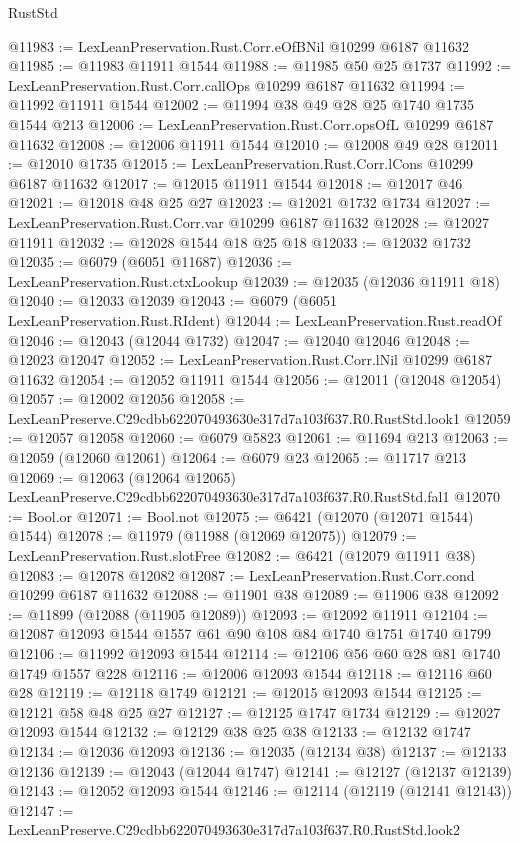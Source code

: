 \begin{lexlean}{RustStd}
\begin{coremodule}
@11983 := LexLeanPreservation.Rust.Corr.eOfBNil @10299 @6187 @11632
@11985 := @11983 @11911 @1544
@11988 := @11985 @50 @25 @1737
@11992 := LexLeanPreservation.Rust.Corr.callOps @10299 @6187 @11632
@11994 := @11992 @11911 @1544
@12002 := @11994 @38 @49 @28 @25 @1740 @1735 @1544 @213
@12006 := LexLeanPreservation.Rust.Corr.opsOfL @10299 @6187 @11632
@12008 := @12006 @11911 @1544
@12010 := @12008 @49 @28
@12011 := @12010 @1735
@12015 := LexLeanPreservation.Rust.Corr.lCons @10299 @6187 @11632
@12017 := @12015 @11911 @1544
@12018 := @12017 @46
@12021 := @12018 @48 @25 @27
@12023 := @12021 @1732 @1734
@12027 := LexLeanPreservation.Rust.Corr.var @10299 @6187 @11632
@12028 := @12027 @11911
@12032 := @12028 @1544 @18 @25 @18
@12033 := @12032 @1732
@12035 := @6079 (@6051 @11687)
@12036 := LexLeanPreservation.Rust.ctxLookup
@12039 := @12035 (@12036 @11911 @18)
@12040 := @12033 @12039
@12043 := @6079 (@6051 LexLeanPreservation.Rust.RIdent)
@12044 := LexLeanPreservation.Rust.readOf
@12046 := @12043 (@12044 @1732)
@12047 := @12040 @12046
@12048 := @12023 @12047
@12052 := LexLeanPreservation.Rust.Corr.lNil @10299 @6187 @11632
@12054 := @12052 @11911 @1544
@12056 := @12011 (@12048 @12054)
@12057 := @12002 @12056
@12058 := LexLeanPreserve.C29cdbb622070493630e317d7a103f637.R0.RustStd.look1
@12059 := @12057 @12058
@12060 := @6079 @5823
@12061 := @11694 @213
@12063 := @12059 (@12060 @12061)
@12064 := @6079 @23
@12065 := @11717 @213
@12069 := @12063 (@12064 @12065) LexLeanPreserve.C29cdbb622070493630e317d7a103f637.R0.RustStd.fal1
@12070 := Bool.or
@12071 := Bool.not
@12075 := @6421 (@12070 (@12071 @1544) @1544)
@12078 := @11979 (@11988 (@12069 @12075))
@12079 := LexLeanPreservation.Rust.slotFree
@12082 := @6421 (@12079 @11911 @38)
@12083 := @12078 @12082
@12087 := LexLeanPreservation.Rust.Corr.cond @10299 @6187 @11632
@12088 := @11901 @38
@12089 := @11906 @38
@12092 := @11899 (@12088 (@11905 @12089))
@12093 := @12092 @11911
@12104 := @12087 @12093 @1544 @1557 @61 @90 @108 @84 @1740 @1751 @1740 @1799
@12106 := @11992 @12093 @1544
@12114 := @12106 @56 @60 @28 @81 @1740 @1749 @1557 @228
@12116 := @12006 @12093 @1544
@12118 := @12116 @60 @28
@12119 := @12118 @1749
@12121 := @12015 @12093 @1544
@12125 := @12121 @58 @48 @25 @27
@12127 := @12125 @1747 @1734
@12129 := @12027 @12093 @1544
@12132 := @12129 @38 @25 @38
@12133 := @12132 @1747
@12134 := @12036 @12093
@12136 := @12035 (@12134 @38)
@12137 := @12133 @12136
@12139 := @12043 (@12044 @1747)
@12141 := @12127 (@12137 @12139)
@12143 := @12052 @12093 @1544
@12146 := @12114 (@12119 (@12141 @12143))
@12147 := LexLeanPreserve.C29cdbb622070493630e317d7a103f637.R0.RustStd.look2

\end{coremodule}
\end{lexlean}
